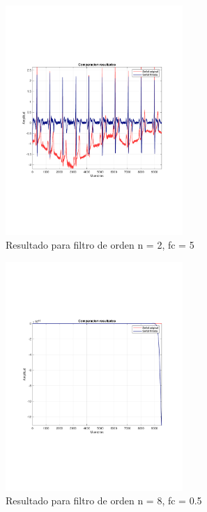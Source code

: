 		\begin{figure}[H]
			\center
			\includegraphics[width=0.6\textwidth,clip, trim = {1.9cm 6.8cm 2.3cm 7cm}]{../plots/1_c_ecg_filtered_2_freq_5.pdf}
			\caption{Resultado para filtro de orden n = 2, fc = 5}
			\label{fig:1_c_filter_n2_fc_5}
		\end{figure}
		
		\begin{figure}[H]
			\center
			\includegraphics[width=0.6\textwidth,clip, trim = {1.9cm 6.8cm 2.3cm 7cm}]{../plots/1_c_ecg_filtered_8_freq_05.pdf}
			\caption{Resultado para filtro de orden n = 8, fc = 0.5}
			\label{fig:1_c_filter_n8_fc_05}
		\end{figure}
		
